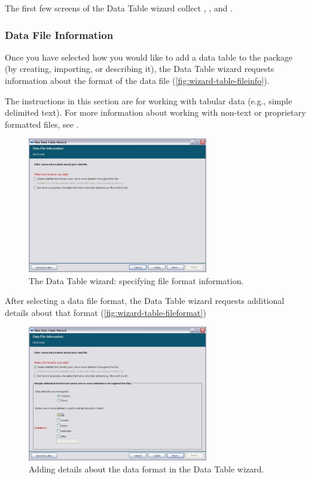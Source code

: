 The first few screens of the Data Table wizard collect
, , and
.

\subsubsection{Data File Information} \label{sec:table-file-info}

Once you have selected how you would like to add a data table to the
package (by creating, importing, or describing it), the Data Table
wizard requests information about the format of the data file
(\autoref{fig:wizard-table-fileinfo}).

The instructions in this section are for working with tabular data
(e.g., simple delimited text). For more information about working with
non-text or proprietary formatted files, see
.

\begin{figure}
  \centering
    \includegraphics[width=0.7\textwidth]{images/wizard-table-fileinfo.jpg}
  \caption{The Data Table wizard: specifying file format information.}
  \label{fig:wizard-table-fileinfo}
\end{figure}

After selecting a data file format, the Data Table wizard requests
additional details about that format
(\autoref{fig:wizard-table-fileformat})

\begin{figure}
  \centering
    \includegraphics[width=0.7\textwidth]{images/wizard-table-fileformat.jpg}
  \caption{Adding details about the data format in the Data Table
    wizard.}
  \label{fig:wizard-table-fileformat}
\end{figure}

